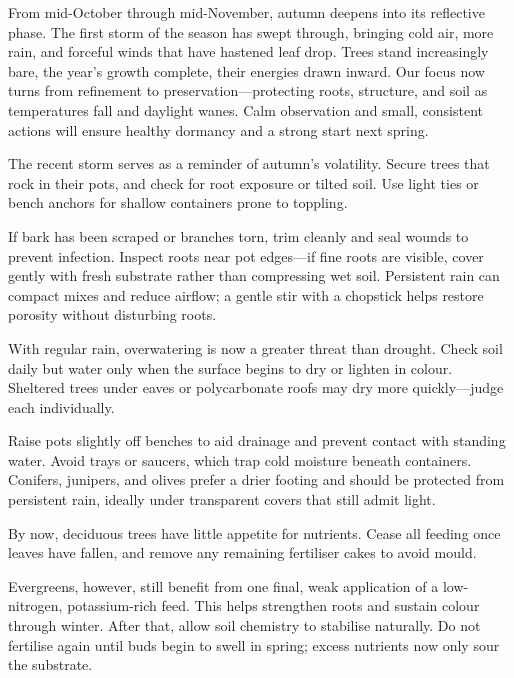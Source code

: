 \label{2025-10-care}
\noindent
From mid\--October through mid\--November, autumn deepens into its reflective phase.
The first storm of the season has swept through, bringing cold air, more rain, and forceful winds that have hastened leaf drop.
Trees stand increasingly bare, the year's growth complete, their energies drawn inward.
Our focus now turns from refinement to preservation---protecting roots, structure, and soil as temperatures fall and daylight wanes.
Calm observation and small, consistent actions will ensure healthy dormancy and a strong start next spring.

\medskip
{}
\noindent
The recent storm serves as a reminder of autumn's volatility.
Secure trees that rock in their pots, and check for root exposure or tilted soil.
Use light ties or bench anchors for shallow containers prone to toppling.

If bark has been scraped or branches torn, trim cleanly and seal wounds to prevent infection.
Inspect roots near pot edges---if fine roots are visible, cover gently with fresh substrate rather than compressing wet soil.
Persistent rain can compact mixes and reduce airflow; a gentle stir with a chopstick helps restore porosity without disturbing roots.

\medskip
{}
\noindent
With regular rain, overwatering is now a greater threat than drought.
Check soil daily but water only when the surface begins to dry or lighten in colour.
Sheltered trees under eaves or polycarbonate roofs may dry more quickly---judge each individually.

Raise pots slightly off benches to aid drainage and prevent contact with standing water.
Avoid trays or saucers, which trap cold moisture beneath containers.
Conifers, junipers, and olives prefer a drier footing and should be protected from persistent rain, ideally under transparent covers that still admit light.

\medskip
{}
\noindent
By now, deciduous trees have little appetite for nutrients.
Cease all feeding once leaves have fallen, and remove any remaining fertiliser cakes to avoid mould.

Evergreens, however, still benefit from one final, weak application of a low\--nitrogen, potassium\--rich feed.
This helps strengthen roots and sustain colour through winter.
After that, allow soil chemistry to stabilise naturally.
Do not fertilise again until buds begin to swell in spring; excess nutrients now only sour the substrate.

